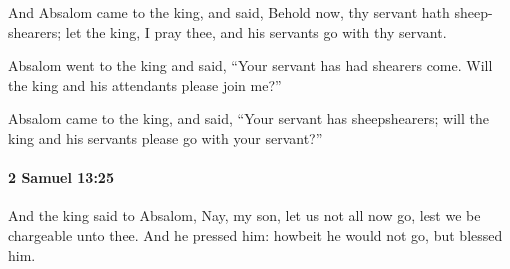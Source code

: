 			\begin{versebox}
					\item[BHS] 
					\item[ASV] And Absalom came to the king, and said, Behold now, thy servant hath sheep-shearers; let the king, I pray thee, and his servants go with thy servant.
					\item[NIV] Absalom went to the king and said, “Your servant has had shearers come. Will the king and his attendants please join me?”
					\item[NRSV] Absalom came to the king, and said, “Your servant has sheepshearers; will the king and his servants please go with your servant?”
			\end{versebox}

		\paragraph{2 Samuel 13:25} %
			\label{2SAMUEL-13-25}

			And the king said to Absalom, Nay, my son, let us not all now go, lest we be chargeable unto thee. And he pressed him: howbeit he would not go, but blessed him.

